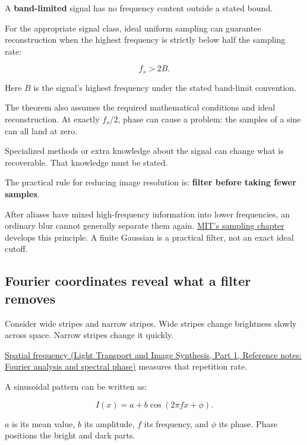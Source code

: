 A \textbf{band-limited} signal has no frequency content outside a stated bound.

For the appropriate signal class, ideal uniform sampling can guarantee reconstruction when the highest frequency is strictly below half the sampling rate:

\[
f_s>2B.
\]

Here \(B\) is the signal's highest frequency under the stated band-limit convention.

The theorem also assumes the required mathematical conditions and ideal reconstruction. At exactly \(f_s/2\), phase can cause a problem: the samples of a sine can all land at zero.

Specialized methods or extra knowledge about the signal can change what is recoverable. That knowledge must be stated.

The practical rule for reducing image resolution is: \textbf{filter before taking fewer samples}.

After aliases have mixed high-frequency information into lower frequencies, an ordinary blur cannot generally separate them again. \href{https://visionbook.mit.edu/sampling_and_aliasing.html}{MIT's sampling chapter} develops this principle. A finite Gaussian is a practical filter, not an exact ideal cutoff.

\subsection{Fourier coordinates reveal what a filter removes}\label{04-visual-computing-ii-ch042-fourier-coordinates-reveal-what-a-filter-removes}

\hypertarget{04-visual-computing-ii-ch042-fourier-coordinates-reveal-what-a-filter-removes}{}

Consider wide stripes and narrow stripes. Wide stripes change brightness slowly across space. Narrow stripes change it quickly.

\href{../04-Light-Transport-and-Image-Synthesis-P01/main.pdf\#nameddest=appendix-b60686ba06a1}{Spatial frequency (Light Transport and Image Synthesis, Part 1, Reference notes: Fourier analysis and spectral phase)} measures that repetition rate.

A sinusoidal pattern can be written as:

\[
I(x)=a+b\cos(2\pi fx+\phi).
\]

\(a\) is its mean value, \(b\) its amplitude, \(f\) its frequency, and \(\phi\) its phase. Phase positions the bright and dark parts.

